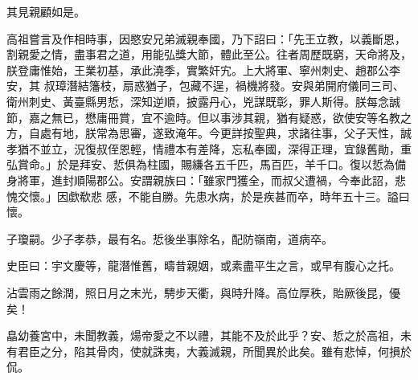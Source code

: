 \begin{pinyinscope}
 其見親顧如是。



 高祖嘗言及作相時事，因愍安兄弟滅親奉國，乃下詔曰：「先王立教，以義斷恩，割親愛之情，盡事君之道，用能弘獎大節，體此至公。往者周歷既窮，天命將及，朕登庸惟始，王業初基，承此澆季，實繁奸宄。上大將軍、寧州刺史、趙郡公李安，其
 叔璋潛結籓枝，扇惑猶子，包藏不逞，禍機將發。安與弟開府儀同三司、衛州刺史、黃臺縣男悊，深知逆順，披露丹心，兇謀既彰，罪人斯得。朕每念誠節，嘉之無已，懋庸冊賞，宜不逾時。但以事涉其親，猶有疑惑，欲使安等名教之方，自處有地，朕常為思審，遂致淹年。今更詳按聖典，求諸往事，父子天性，誠孝猶不並立，況復叔侄恩輕，情禮本有差降，忘私奉國，深得正理，宜錄舊勛，重弘賞命。」於是拜安、悊俱為柱國，賜縑各五千匹，馬百匹，羊千口。復以悊為備身將軍，進封順陽郡公。安謂親族曰：「雖家門獲全，而叔父遭禍，今奉此詔，悲愧交懷。」因歔欷悲
 感，不能自勝。先患水病，於是疾甚而卒，時年五十三。謚曰懷。



 子瓊嗣。少子孝恭，最有名。悊後坐事除名，配防嶺南，道病卒。



 史臣曰：宇文慶等，龍潛惟舊，疇昔親姻，或素盡平生之言，或早有腹心之托。



 沾雲雨之餘潤，照日月之末光，騁步天衢，與時升降。高位厚秩，貽厥後昆，優矣！



 皛幼養宮中，未聞教義，煬帝愛之不以禮，其能不及於此乎？安、悊之於高祖，未有君臣之分，陷其骨肉，使就誅夷，大義滅親，所聞異於此矣。雖有悲悼，何損於侃。



\end{pinyinscope}